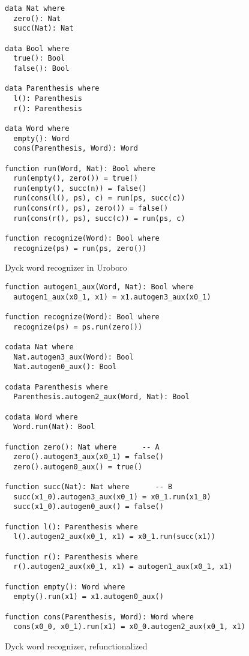 \begin{figure}

\begin{lstlisting}
data Nat where
  zero(): Nat
  succ(Nat): Nat

data Bool where
  true(): Bool
  false(): Bool

data Parenthesis where
  l(): Parenthesis
  r(): Parenthesis

data Word where
  empty(): Word
  cons(Parenthesis, Word): Word

function run(Word, Nat): Bool where
  run(empty(), zero()) = true()
  run(empty(), succ(n)) = false()
  run(cons(l(), ps), c) = run(ps, succ(c))
  run(cons(r(), ps), zero()) = false()
  run(cons(r(), ps), succ(c)) = run(ps, c)

function recognize(Word): Bool where
  recognize(ps) = run(ps, zero())
\end{lstlisting}
\caption{Dyck word recognizer in Uroboro}
\label{fig:dyck}
\end{figure}

\begin{figure}
\begin{lstlisting}
function autogen1_aux(Word, Nat): Bool where
  autogen1_aux(x0_1, x1) = x1.autogen3_aux(x0_1)

function recognize(Word): Bool where
  recognize(ps) = ps.run(zero())

codata Nat where
  Nat.autogen3_aux(Word): Bool
  Nat.autogen0_aux(): Bool

codata Parenthesis where
  Parenthesis.autogen2_aux(Word, Nat): Bool

codata Word where
  Word.run(Nat): Bool

function zero(): Nat where      -- A
  zero().autogen3_aux(x0_1) = false()
  zero().autogen0_aux() = true()

function succ(Nat): Nat where      -- B
  succ(x1_0).autogen3_aux(x0_1) = x0_1.run(x1_0)
  succ(x1_0).autogen0_aux() = false()

function l(): Parenthesis where
  l().autogen2_aux(x0_1, x1) = x0_1.run(succ(x1))

function r(): Parenthesis where
  r().autogen2_aux(x0_1, x1) = autogen1_aux(x0_1, x1)

function empty(): Word where
  empty().run(x1) = x1.autogen0_aux()

function cons(Parenthesis, Word): Word where
  cons(x0_0, x0_1).run(x1) = x0_0.autogen2_aux(x0_1, x1)
\end{lstlisting}
\caption{Dyck word recognizer, refunctionalized}
\label{fig:dyckrefunced}
\end{figure}

